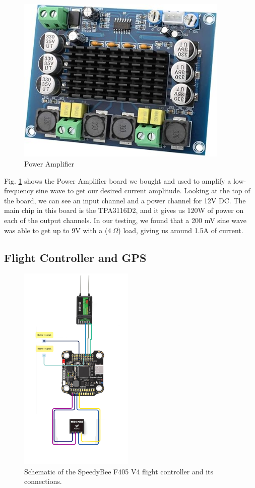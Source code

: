 \begin{figure}[H]
    \centering
    \includegraphics[height=8cm]{power_amp.jpg}
    \caption{Power Amplifier}
    \label{fig:Power Amp}
\end{figure}
Fig. \ref{fig:Power Amp} shows the Power Amplifier board we bought and used to amplify a low-frequency sine wave to get our desired current amplitude. Looking at the top of the board, we can see an input channel and a power channel for 12V DC. The main chip in this board is the TPA3116D2, and it gives us 120W of power on each of the output channels. In our testing, we found that a 200 mV sine wave was able to get up to 9V with a ($4~\Omega$) load, giving us around 1.5A of current.

\subsection{Flight Controller and GPS}
\begin{figure}[H]
    \centering
    \includegraphics[height=10cm]{speedybee.png}
    \caption{Schematic of the SpeedyBee F405 V4 flight controller and its connections.}
    \label{fig:Speedybee}
\end{figure}

